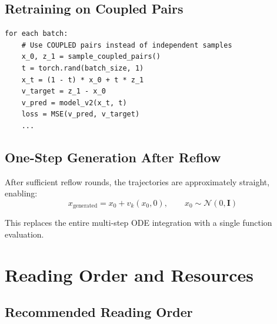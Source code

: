 \documentclass[11pt, a4paper]{article}
\newcommand{\N}{\mathcal{N}}
\newcommand{\Id}{\mathbf{I}}
\begin{document}
\subsection{Retraining on Coupled Pairs}

\begin{tcolorbox}[colback=codebg, colframe=codeframe, title=\textbf{Step 2: Retrain $v_2$ on coupled pairs}]
\begin{lstlisting}
for each batch:
    # Use COUPLED pairs instead of independent samples
    x_0, z_1 = sample_coupled_pairs()
    t = torch.rand(batch_size, 1)
    x_t = (1 - t) * x_0 + t * z_1
    v_target = z_1 - x_0
    v_pred = model_v2(x_t, t)
    loss = MSE(v_pred, v_target)
    ...
\end{lstlisting}
\end{tcolorbox}

\subsection{One-Step Generation After Reflow}

After sufficient reflow rounds, the trajectories are approximately straight,
enabling:
\begin{equation}
  x_{\mathrm{generated}} = x_0 + v_k(x_0, 0),
  \qquad x_0 \sim \N(0, \Id)
\end{equation}

This replaces the entire multi-step ODE integration with a single function
evaluation.

\section{Reading Order and Resources}
\label{sec:resources}

\subsection{Recommended Reading Order}
\end{document}
